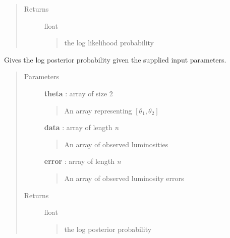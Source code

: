 \documentclass[letterpaper,10pt,english]{sphinxmanual}
\begin{document}
\begin{fulllineitems}
\begin{fulllineitems}
\begin{quote}
\begin{description}
\item[{Returns}] \leavevmode
float
\begin{quote}

the log likelihood probability
\end{quote}

\end{description}\end{quote}

\end{fulllineitems}


\begin{fulllineitems}
\label{dessn.simple:dessn.simple.exampleIntegral.ExampleIntegral.get_posterior}
Gives the log posterior probability given the supplied input parameters.
\begin{quote}\begin{description}
\item[{Parameters}] \leavevmode
\textbf{theta} : array of size 2
\begin{quote}

An array representing \([\theta_1,\theta_2]\)
\end{quote}

\textbf{data} : array of length \emph{n}
\begin{quote}

An array of observed luminosities
\end{quote}

\textbf{error} : array of length \emph{n}
\begin{quote}

An array of observed luminosity errors
\end{quote}

\item[{Returns}] \leavevmode
float
\begin{quote}

the log posterior probability
\end{quote}

\end{description}\end{quote}

\end{fulllineitems}



\end{fulllineitems}
\end{document}
